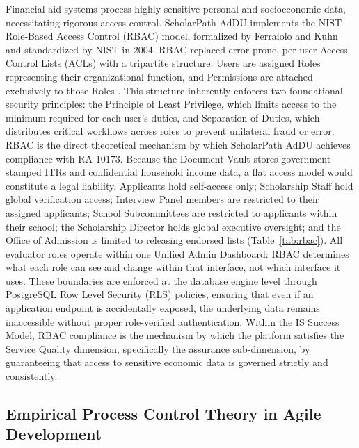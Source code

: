 Financial aid systems process highly sensitive personal and socioeconomic data, necessitating rigorous access control. ScholarPath AdDU implements the NIST Role-Based Access Control (RBAC) model, formalized by Ferraiolo and Kuhn \cite{ref24} and standardized by NIST in 2004. RBAC replaced error-prone, per-user Access Control Lists (ACLs) with a tripartite structure: Users are assigned Roles representing their organizational function, and Permissions are attached exclusively to those Roles \cite{ref38}. This structure inherently enforces two foundational security principles: the Principle of Least Privilege, which limits access to the minimum required for each user's duties, and Separation of Duties, which distributes critical workflows across roles to prevent unilateral fraud or error. RBAC is the direct theoretical mechanism by which ScholarPath AdDU achieves compliance with RA 10173. Because the Document Vault stores government-stamped ITRs and confidential household income data, a flat access model would constitute a legal liability. Applicants hold self-access only; Scholarship Staff hold global verification access; Interview Panel members are restricted to their assigned applicants; School Subcommittees are restricted to applicants within their school; the Scholarship Director holds global executive oversight; and the Office of Admission is limited to releasing endorsed lists (Table~\ref{tab:rbac}). All evaluator roles operate within one Unified Admin Dashboard: RBAC determines what each role can see and change within that interface, not which interface it uses. These boundaries are enforced at the database engine level through PostgreSQL Row Level Security (RLS) policies, ensuring that even if an application endpoint is accidentally exposed, the underlying data remains inaccessible without proper role-verified authentication. Within the IS Success Model, RBAC compliance is the mechanism by which the platform satisfies the Service Quality dimension, specifically the assurance sub-dimension, by guaranteeing that access to sensitive economic data is governed strictly and consistently.

\subsection{Empirical Process Control Theory in Agile Development}

